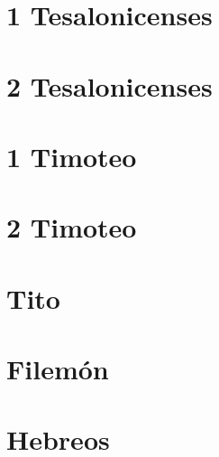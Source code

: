 \chapter{1 Tesalonicenses}
\begin{multicols}{2}
  \raggedcolumns
  \parskip=0pt \relax
  
\end{multicols}

\chapter{2 Tesalonicenses}
\begin{multicols}{2}
  \raggedcolumns
  \parskip=0pt \relax
  
\end{multicols}

\chapter{1 Timoteo}
\begin{multicols}{2}
  \raggedcolumns
  \parskip=0pt \relax
  
\end{multicols}

\chapter{2 Timoteo}
\begin{multicols}{2}
  \raggedcolumns
  \parskip=0pt \relax
  
\end{multicols}

\chapter{Tito}
\begin{multicols}{2}
  \raggedcolumns
  \parskip=0pt \relax
  
\end{multicols}

\chapter{Filemón}
\begin{multicols}{2}
  \raggedcolumns
  \parskip=0pt \relax
  
\end{multicols}

\chapter{Hebreos}
\begin{multicols}{2}
  \raggedcolumns
  \parskip=0pt \relax
  
\end{multicols}

